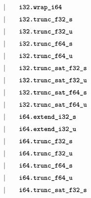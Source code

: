 \begin{alignat*}{9}
    &&       &&\quad | &\quad && \textbf{\texttt{i32.wrap\textunderscore i64}} \quad &&  \\[1mm]
    &&       &&\quad | &\quad && \textbf{\texttt{i32.trunc\textunderscore f32\textunderscore s}} \quad &&  \\[1mm]
    &&       &&\quad | &\quad && \textbf{\texttt{i32.trunc\textunderscore f32\textunderscore u}} \quad &&  \\[1mm]
    &&       &&\quad | &\quad && \textbf{\texttt{i32.trunc\textunderscore f64\textunderscore s}} \quad &&  \\[1mm]
    &&       &&\quad | &\quad && \textbf{\texttt{i32.trunc\textunderscore f64\textunderscore u}} \quad &&  \\[1mm]
    &&       &&\quad | &\quad && \textbf{\texttt{i32.trunc\textunderscore sat\textunderscore f32\textunderscore s}} \quad &&  \\[1mm]
    &&       &&\quad | &\quad && \textbf{\texttt{i32.trunc\textunderscore sat\textunderscore f32\textunderscore u}} \quad &&  \\[1mm]
    &&       &&\quad | &\quad && \textbf{\texttt{i32.trunc\textunderscore sat\textunderscore f64\textunderscore s}} \quad &&  \\[1mm]
    &&       &&\quad | &\quad && \textbf{\texttt{i32.trunc\textunderscore sat\textunderscore f64\textunderscore u}} \quad &&  \\[1mm]
    &&       &&\quad | &\quad && \textbf{\texttt{i64.extend\textunderscore i32\textunderscore s}} \quad &&  \\[1mm]
    &&       &&\quad | &\quad && \textbf{\texttt{i64.extend\textunderscore i32\textunderscore u}} \quad &&  \\[1mm]
    &&       &&\quad | &\quad && \textbf{\texttt{i64.trunc\textunderscore f32\textunderscore s}} \quad &&  \\[1mm]
    &&       &&\quad | &\quad && \textbf{\texttt{i64.trunc\textunderscore f32\textunderscore u}} \quad &&  \\[1mm]
    &&       &&\quad | &\quad && \textbf{\texttt{i64.trunc\textunderscore f64\textunderscore s}} \quad &&  \\[1mm]
    &&       &&\quad | &\quad && \textbf{\texttt{i64.trunc\textunderscore f64\textunderscore u}} \quad &&  \\[1mm]
    &&       &&\quad | &\quad && \textbf{\texttt{i64.trunc\textunderscore sat\textunderscore f32\textunderscore s}} \quad &&  \\[1mm]

\end{alignat*}
